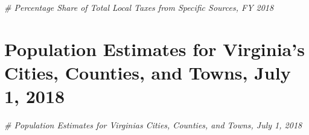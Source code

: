 \documentclass[
]{book}
\newenvironment{Shaded}{\begin{snugshade}}{\end{snugshade}}
\newcommand{\CommentTok}[1]{\textcolor[rgb]{0.56,0.35,0.01}{\textit{#1}}}
\begin{document}
\begin{Shaded}
\begin{Highlighting}[]
\CommentTok{\# Percentage Share of Total Local Taxes from Specific Sources, FY 2018}
\end{Highlighting}
\end{Shaded}

\hypertarget{population-estimates-for-virginias-cities-counties-and-towns-july-1-2018}{%
\chapter{Population Estimates for Virginia's Cities, Counties, and Towns, July 1, 2018}\label{population-estimates-for-virginias-cities-counties-and-towns-july-1-2018}}

\begin{Shaded}
\begin{Highlighting}[]
\CommentTok{\# Population Estimates for Virginia\textquotesingle{}s Cities, Counties, and Towns, July 1, 2018}
\end{Highlighting}
\end{Shaded}


  
\end{document}
